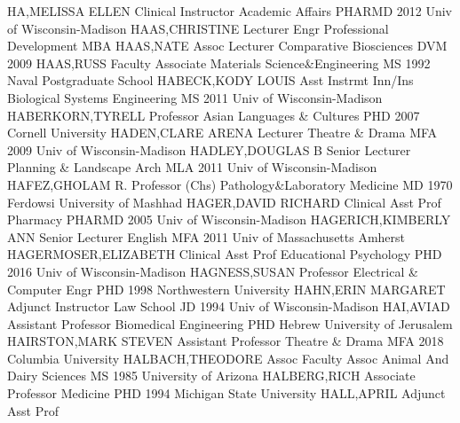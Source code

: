 \documentclass[
]{article}
\begin{document}
HA,MELISSA ELLEN \textbar Clinical Instructor \textbar Academic Affairs
\textbar PHARMD 2012 Univ of Wisconsin-Madison \textbar{} 
\textbar HAAS,CHRISTINE \textbar Lecturer \textbar Engr Professional
Development \textbar MBA \textbar{}  \textbar HAAS,NATE
\textbar Assoc Lecturer \textbar Comparative Biosciences \textbar DVM
2009 \textbar{}  \textbar HAAS,RUSS \textbar Faculty
Associate \textbar Materials Science\&Engineering \textbar MS 1992 Naval
Postgraduate School \textbar{}  \textbar HABECK,KODY LOUIS
\textbar Asst Instrmt Inn/Ins \textbar Biological Systems Engineering
\textbar MS 2011 Univ of Wisconsin-Madison \textbar{} 
\textbar HABERKORN,TYRELL \textbar Professor \textbar Asian Languages \&
Cultures \textbar PHD 2007 Cornell University \textbar{} 
\textbar HADEN,CLARE ARENA \textbar Lecturer \textbar Theatre \& Drama
\textbar MFA 2009 Univ of Wisconsin-Madison \textbar{} 
\textbar HADLEY,DOUGLAS B \textbar Senior Lecturer \textbar Planning \&
Landscape Arch \textbar MLA 2011 Univ of Wisconsin-Madison \textbar{}
 \textbar HAFEZ,GHOLAM R. \textbar Professor (Chs)
\textbar Pathology\&Laboratory Medicine \textbar MD 1970 Ferdowsi
University of Mashhad \textbar{}  \textbar HAGER,DAVID
RICHARD \textbar Clinical Asst Prof \textbar Pharmacy \textbar PHARMD
2005 Univ of Wisconsin-Madison \textbar{} 
\textbar HAGERICH,KIMBERLY ANN \textbar Senior Lecturer \textbar English
\textbar MFA 2011 Univ of Massachusetts Amherst \textbar{} 
\textbar HAGERMOSER,ELIZABETH \textbar Clinical Asst Prof
\textbar Educational Psychology \textbar PHD 2016 Univ of
Wisconsin-Madison \textbar{}  \textbar HAGNESS,SUSAN
\textbar Professor \textbar Electrical \& Computer Engr \textbar PHD
1998 Northwestern University \textbar{}  \textbar HAHN,ERIN
MARGARET \textbar Adjunct Instructor \textbar Law School \textbar JD
1994 Univ of Wisconsin-Madison \textbar{} 
\textbar HAI,AVIAD \textbar Assistant Professor \textbar Biomedical
Engineering \textbar PHD Hebrew University of Jerusalem \textbar{}
 \textbar HAIRSTON,MARK STEVEN \textbar Assistant Professor
\textbar Theatre \& Drama \textbar MFA 2018 Columbia University
\textbar{}  \textbar HALBACH,THEODORE \textbar Assoc Faculty
Assoc \textbar Animal And Dairy Sciences \textbar MS 1985 University of
Arizona \textbar{}  \textbar HALBERG,RICH \textbar Associate
Professor \textbar Medicine \textbar PHD 1994 Michigan State University
\textbar{}  \textbar HALL,APRIL \textbar Adjunct Asst Prof
\end{document}
